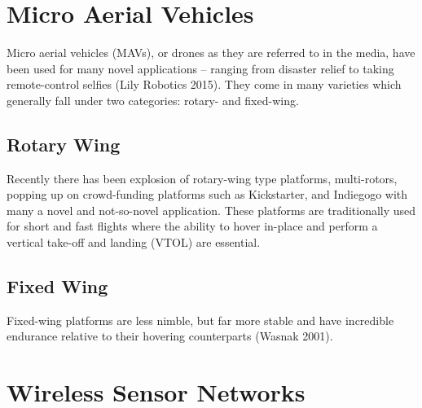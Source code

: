 
\section{Micro Aerial Vehicles}

Micro aerial vehicles (MAVs), or drones as they are referred to in the media, have been used for many novel applications – ranging from disaster relief to taking remote-control selfies (Lily Robotics 2015). They come in many varieties which generally fall under two categories: rotary- and fixed-wing.


\subsection{Rotary Wing}

Recently there has been explosion of rotary-wing type platforms, multi-rotors, popping up on crowd-funding platforms such as Kickstarter, and Indiegogo with many a novel and not-so-novel application. These platforms are traditionally used for short and fast flights where the ability to hover in-place and perform a vertical take-off and landing (VTOL) are essential.


\subsection{Fixed Wing}

Fixed-wing platforms are less nimble, but far more stable and have incredible endurance relative to their hovering counterparts (Wasnak 2001).


\section{Wireless Sensor Networks}

